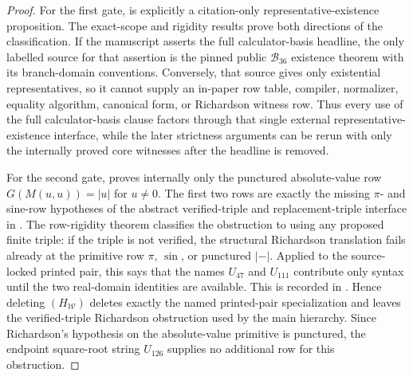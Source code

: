 \begin{proof}
For the first gate,  is explicitly a citation-only
representative-existence proposition.  The exact-scope and rigidity results
prove both directions of the classification.  If the manuscript asserts the full
calculator-basis headline, the only labelled source for that assertion is the
pinned public \(\mathcal B_{36}\) existence theorem with its branch-domain
conventions.  Conversely, that source gives only existential representatives, so
it cannot supply an in-paper row table, compiler, normalizer, equality algorithm,
canonical form, or Richardson witness row.  Thus every use of the full
calculator-basis clause factors through that single external representative-
existence interface, while the later strictness arguments can be rerun with only
the internally proved core witnesses after the headline is removed.

For the second gate,  proves internally
only the punctured absolute-value row \(G(M(u,u))=|u|\) for \(u\ne0\).  The first
two rows are exactly the missing \(\pi\)- and sine-row hypotheses of the abstract verified-triple and
replacement-triple interface in
.
The row-rigidity theorem classifies the obstruction to using any proposed finite
triple: if the triple is not verified, the structural Richardson translation
fails already at the primitive row \(\pi\), \(\sin\), or punctured \(|-|\).  Applied
to the source-locked printed pair, this says that the names \(U_{47}\) and
\(U_{111}\) contribute only syntax until the two real-domain identities are
available.  This is recorded in
.
Hence deleting \((H_{\mathcal W})\) deletes exactly the named printed-pair
specialization and leaves the verified-triple Richardson obstruction used by the
main hierarchy.  Since Richardson's hypothesis on the absolute-value primitive is
punctured, the endpoint square-root string \(U_{126}\) supplies no additional row
for this obstruction.


\end{proof}
